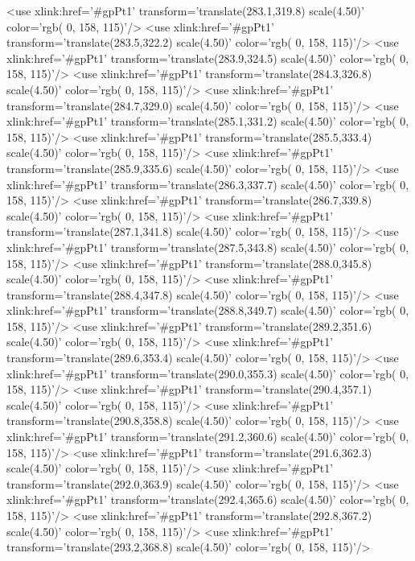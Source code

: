 	<use xlink:href='#gpPt1' transform='translate(283.1,319.8) scale(4.50)' color='rgb(  0, 158, 115)'/>
	<use xlink:href='#gpPt1' transform='translate(283.5,322.2) scale(4.50)' color='rgb(  0, 158, 115)'/>
	<use xlink:href='#gpPt1' transform='translate(283.9,324.5) scale(4.50)' color='rgb(  0, 158, 115)'/>
	<use xlink:href='#gpPt1' transform='translate(284.3,326.8) scale(4.50)' color='rgb(  0, 158, 115)'/>
	<use xlink:href='#gpPt1' transform='translate(284.7,329.0) scale(4.50)' color='rgb(  0, 158, 115)'/>
	<use xlink:href='#gpPt1' transform='translate(285.1,331.2) scale(4.50)' color='rgb(  0, 158, 115)'/>
	<use xlink:href='#gpPt1' transform='translate(285.5,333.4) scale(4.50)' color='rgb(  0, 158, 115)'/>
	<use xlink:href='#gpPt1' transform='translate(285.9,335.6) scale(4.50)' color='rgb(  0, 158, 115)'/>
	<use xlink:href='#gpPt1' transform='translate(286.3,337.7) scale(4.50)' color='rgb(  0, 158, 115)'/>
	<use xlink:href='#gpPt1' transform='translate(286.7,339.8) scale(4.50)' color='rgb(  0, 158, 115)'/>
	<use xlink:href='#gpPt1' transform='translate(287.1,341.8) scale(4.50)' color='rgb(  0, 158, 115)'/>
	<use xlink:href='#gpPt1' transform='translate(287.5,343.8) scale(4.50)' color='rgb(  0, 158, 115)'/>
	<use xlink:href='#gpPt1' transform='translate(288.0,345.8) scale(4.50)' color='rgb(  0, 158, 115)'/>
	<use xlink:href='#gpPt1' transform='translate(288.4,347.8) scale(4.50)' color='rgb(  0, 158, 115)'/>
	<use xlink:href='#gpPt1' transform='translate(288.8,349.7) scale(4.50)' color='rgb(  0, 158, 115)'/>
	<use xlink:href='#gpPt1' transform='translate(289.2,351.6) scale(4.50)' color='rgb(  0, 158, 115)'/>
	<use xlink:href='#gpPt1' transform='translate(289.6,353.4) scale(4.50)' color='rgb(  0, 158, 115)'/>
	<use xlink:href='#gpPt1' transform='translate(290.0,355.3) scale(4.50)' color='rgb(  0, 158, 115)'/>
	<use xlink:href='#gpPt1' transform='translate(290.4,357.1) scale(4.50)' color='rgb(  0, 158, 115)'/>
	<use xlink:href='#gpPt1' transform='translate(290.8,358.8) scale(4.50)' color='rgb(  0, 158, 115)'/>
	<use xlink:href='#gpPt1' transform='translate(291.2,360.6) scale(4.50)' color='rgb(  0, 158, 115)'/>
	<use xlink:href='#gpPt1' transform='translate(291.6,362.3) scale(4.50)' color='rgb(  0, 158, 115)'/>
	<use xlink:href='#gpPt1' transform='translate(292.0,363.9) scale(4.50)' color='rgb(  0, 158, 115)'/>
	<use xlink:href='#gpPt1' transform='translate(292.4,365.6) scale(4.50)' color='rgb(  0, 158, 115)'/>
	<use xlink:href='#gpPt1' transform='translate(292.8,367.2) scale(4.50)' color='rgb(  0, 158, 115)'/>
	<use xlink:href='#gpPt1' transform='translate(293.2,368.8) scale(4.50)' color='rgb(  0, 158, 115)'/>
